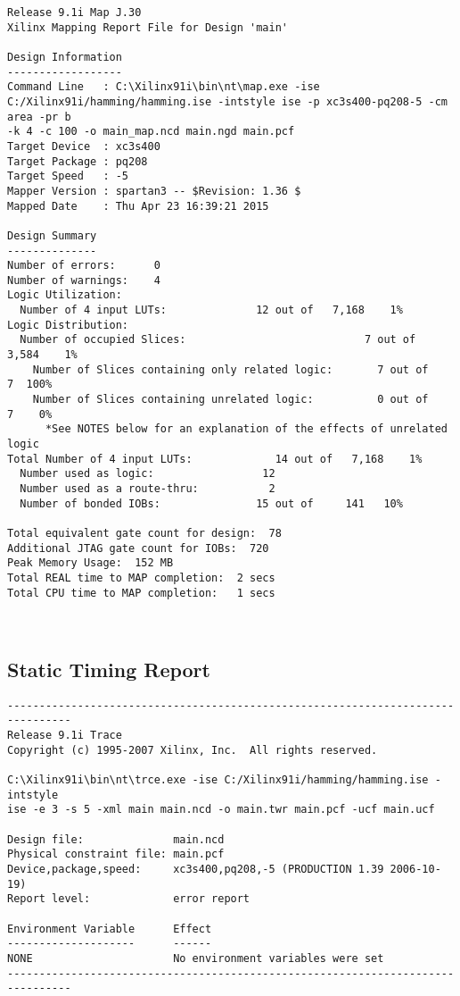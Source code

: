 \documentclass[14pt]{report}
\begin{document}
{\begin{verbatim}
Release 9.1i Map J.30
Xilinx Mapping Report File for Design 'main'

Design Information
------------------
Command Line   : C:\Xilinx91i\bin\nt\map.exe -ise
C:/Xilinx91i/hamming/hamming.ise -intstyle ise -p xc3s400-pq208-5 -cm area -pr b
-k 4 -c 100 -o main_map.ncd main.ngd main.pcf 
Target Device  : xc3s400
Target Package : pq208
Target Speed   : -5
Mapper Version : spartan3 -- $Revision: 1.36 $
Mapped Date    : Thu Apr 23 16:39:21 2015

Design Summary
--------------
Number of errors:      0
Number of warnings:    4
Logic Utilization:
  Number of 4 input LUTs:              12 out of   7,168    1%
Logic Distribution:
  Number of occupied Slices:                            7 out of   3,584    1%
    Number of Slices containing only related logic:       7 out of       7  100%
    Number of Slices containing unrelated logic:          0 out of       7    0%
      *See NOTES below for an explanation of the effects of unrelated logic
Total Number of 4 input LUTs:             14 out of   7,168    1%
  Number used as logic:                 12
  Number used as a route-thru:           2
  Number of bonded IOBs:               15 out of     141   10%

Total equivalent gate count for design:  78
Additional JTAG gate count for IOBs:  720
Peak Memory Usage:  152 MB
Total REAL time to MAP completion:  2 secs 
Total CPU time to MAP completion:   1 secs 



\end{verbatim}
\subsection*{Static Timing Report}
\begin{verbatim}
--------------------------------------------------------------------------------
Release 9.1i Trace 
Copyright (c) 1995-2007 Xilinx, Inc.  All rights reserved.

C:\Xilinx91i\bin\nt\trce.exe -ise C:/Xilinx91i/hamming/hamming.ise -intstyle
ise -e 3 -s 5 -xml main main.ncd -o main.twr main.pcf -ucf main.ucf

Design file:              main.ncd
Physical constraint file: main.pcf
Device,package,speed:     xc3s400,pq208,-5 (PRODUCTION 1.39 2006-10-19)
Report level:             error report

Environment Variable      Effect 
--------------------      ------ 
NONE                      No environment variables were set
--------------------------------------------------------------------------------


\end{verbatim}}
\end{document}

